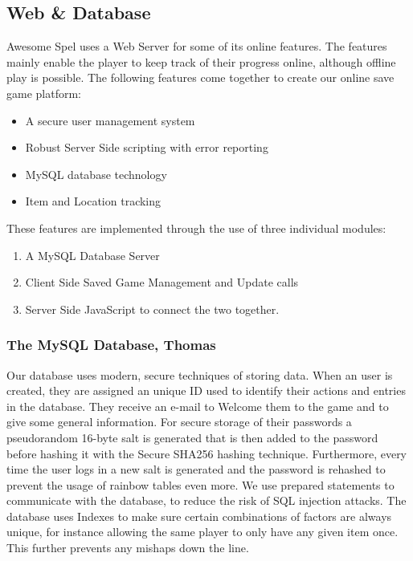 \documentclass{article}
\begin{document}
\subsection{Web \& Database}
Awesome Spel uses a Web Server for some of its online features. The features mainly enable the player to keep track of their progress online, although offline play is possible. The following features come together to create our online save game platform:
\begin{itemize}
\item A secure user management system
\item Robust Server Side scripting with error reporting
\item MySQL database technology
\item Item and Location tracking
\end{itemize}
These features are implemented through the use of three individual modules:
\begin{enumerate}
\item A MySQL Database Server
\item Client Side Saved Game Management and Update calls
\item Server Side JavaScript to connect the two together.
\end{enumerate}
\subsubsection{The MySQL Database, Thomas}
Our database uses modern, secure techniques of storing data. When an user is created, they are assigned an unique ID used to identify their actions and entries in the database. They receive an e-mail to Welcome them to the game and to give some general information. For secure storage of their passwords a pseudorandom 16-byte salt is generated that is then added to the password before hashing it with the Secure SHA256 hashing technique. Furthermore, every time the user logs in a new salt is generated and the password is rehashed to prevent the usage of rainbow tables even more. We use prepared statements to communicate with the database, to reduce the risk of SQL injection attacks. The database uses Indexes to make sure certain combinations of factors are always unique, for instance allowing the same player to only have any given item once. This further prevents any mishaps down the line.
\end{document}
